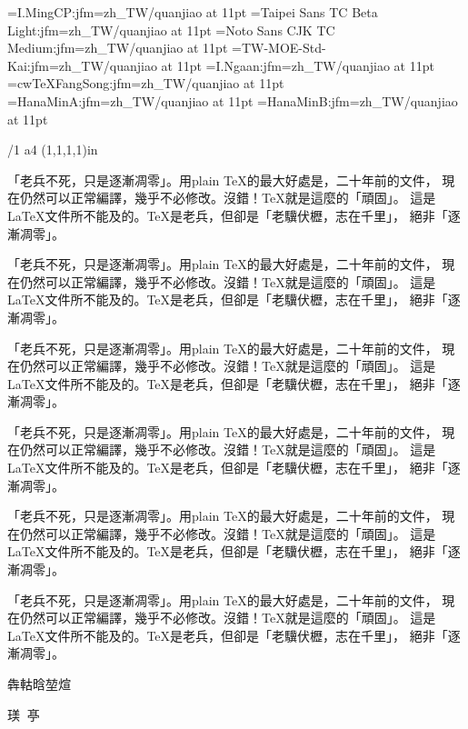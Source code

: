 
\jfont\ming={I.MingCP:jfm=zh_TW/quanjiao} at 11pt
\jfont\hei={Taipei Sans TC Beta Light:jfm=zh_TW/quanjiao} at 11pt
\jfont\heib={Noto Sans CJK TC Medium:jfm=zh_TW/quanjiao} at 11pt
\jfont\kai={TW-MOE-Std-Kai:jfm=zh_TW/quanjiao} at 11pt
\jfont\iyan={I.Ngaan:jfm=zh_TW/quanjiao} at 11pt
\jfont\fangsong={cwTeXFangSong:jfm=zh_TW/quanjiao} at 11pt
\jfont\hminga={HanaMinA:jfm=zh_TW/quanjiao} at 11pt
\jfont\hmingb={HanaMinB:jfm=zh_TW/quanjiao} at 11pt


\margins/1 a4 (1,1,1,1)in  %
\typosize[11/16.4]

\ming
「老兵不死，只是逐漸凋零」。用plain \TeX{}的最大好處是，二十年前的文件，
現在仍然可以正常編譯，幾乎不必修改。沒錯！\TeX{}就是這麼的「頑固」。
這是\LaTeX{}文件所不能及的。\TeX{}是老兵，但卻是「老驥伏櫪，志在千里」，
絕非「逐漸凋零」。

\hei
「老兵不死，只是逐漸凋零」。用plain \TeX{}的最大好處是，二十年前的文件，
現在仍然可以正常編譯，幾乎不必修改。沒錯！\TeX{}就是這麼的「頑固」。
這是\LaTeX{}文件所不能及的。\TeX{}是老兵，但卻是「老驥伏櫪，志在千里」，
絕非「逐漸凋零」。

\heib
「老兵不死，只是逐漸凋零」。用plain \TeX{}的最大好處是，二十年前的文件，
現在仍然可以正常編譯，幾乎不必修改。沒錯！\TeX{}就是這麼的「頑固」。
這是\LaTeX{}文件所不能及的。\TeX{}是老兵，但卻是「老驥伏櫪，志在千里」，
絕非「逐漸凋零」。

\kai
「老兵不死，只是逐漸凋零」。用plain \TeX{}的最大好處是，二十年前的文件，
現在仍然可以正常編譯，幾乎不必修改。沒錯！\TeX{}就是這麼的「頑固」。
這是\LaTeX{}文件所不能及的。\TeX{}是老兵，但卻是「老驥伏櫪，志在千里」，
絕非「逐漸凋零」。

\iyan
「老兵不死，只是逐漸凋零」。用plain \TeX{}的最大好處是，二十年前的文件，
現在仍然可以正常編譯，幾乎不必修改。沒錯！\TeX{}就是這麼的「頑固」。
這是\LaTeX{}文件所不能及的。\TeX{}是老兵，但卻是「老驥伏櫪，志在千里」，
絕非「逐漸凋零」。

\fangsong
「老兵不死，只是逐漸凋零」。用plain \TeX{}的最大好處是，二十年前的文件，
現在仍然可以正常編譯，幾乎不必修改。沒錯！\TeX{}就是這麼的「頑固」。
這是\LaTeX{}文件所不能及的。\TeX{}是老兵，但卻是「老驥伏櫪，志在千里」，
絕非「逐漸凋零」。

\hminga
犇軲晗堃煊

\hmingb
𤧞𠃝𠅀𠅘𫝁𫜁

\bye

